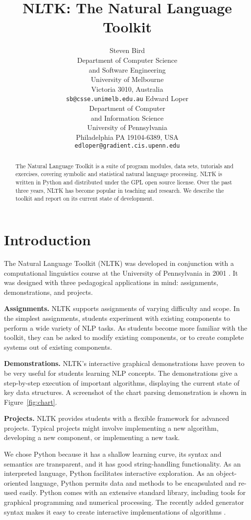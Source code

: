 \documentclass[11pt]{article}
\title{NLTK: The Natural Language Toolkit}
\author{
  Steven Bird \\
  Department of Computer Science \\
  \indent and Software Engineering \\
  University of Melbourne \\
  Victoria 3010, Australia \\  
  {\tt\small sb@csse.unimelb.edu.au}
\And
  Edward Loper\\
  Department of Computer \\
  \indent and Information Science \\
  University of Pennsylvania\\
  Philadelphia PA 19104-6389, USA\\
  {\tt\small edloper@gradient.cis.upenn.edu}
}
\begin{document}
\maketitle

\begin{abstract}\small
  The Natural Language Toolkit is a suite of program modules, data
  sets, tutorials and exercises, covering symbolic and statistical
  natural language processing.  NLTK is written in Python and
  distributed under the GPL open source license.  Over the past three
  years, NLTK has become popular in teaching and research.  We
  describe the toolkit and report on its current state of development.
\end{abstract}

\section{Introduction}

The Natural Language Toolkit (NLTK) was developed in conjunction with
a computational linguistics course at the University of Pennsylvania
in 2001 \cite{LoperBird02}.  It was designed with three pedagogical
applications in mind: assignments, demonstrations, and projects.

\textbf{Assignments.}
NLTK supports assignments of varying difficulty
and scope.  In the simplest assignments, students experiment with
existing components to perform a wide variety of NLP tasks.  As students
become more familiar with the toolkit, they can be asked to modify
existing components, or to create complete systems out of existing
components.

\textbf{Demonstrations.}
NLTK's interactive graphical demonstrations have proven to be very
useful for students learning NLP concepts.
The demonstrations give a step-by-step execution of important
algorithms, displaying the current state of key data structures.
A screenshot of the chart parsing demonstration is shown in Figure~\ref{fig:chart}.

\textbf{Projects.}  NLTK provides students with a flexible framework
for advanced projects.  Typical projects might involve implementing a
new algorithm, developing a new component, or implementing a new
task.

We chose Python because it has a shallow learning curve, its syntax
and semantics are transparent, and it has good string-handling
functionality.  As an interpreted language, Python facilitates
interactive exploration.  As an object-oriented language, Python
permits data and methods to be encapsulated and re-used easily.  Python comes with an extensive
standard library, including tools for graphical programming and
numerical processing.  The recently added generator
syntax makes it easy to create interactive implementations of
algorithms \cite{Loper04,Rossum03intro,Rossum03ref}.
\end{document}
